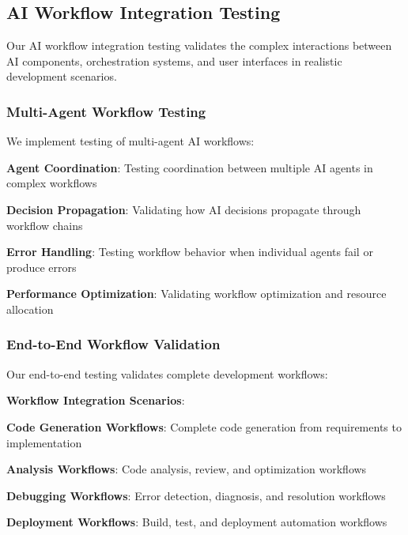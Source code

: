 \subsection*{AI Workflow Integration Testing}

Our AI workflow integration testing validates the complex interactions between AI components, orchestration systems, and user interfaces in realistic development scenarios.

\subsubsection*{Multi-Agent Workflow Testing}

We implement testing of multi-agent AI workflows:

\begin{compactlist}
    \item \textbf{Agent Coordination}: Testing coordination between multiple AI agents in complex workflows
    \item \textbf{Decision Propagation}: Validating how AI decisions propagate through workflow chains
    \item \textbf{Error Handling}: Testing workflow behavior when individual agents fail or produce errors
    \item \textbf{Performance Optimization}: Validating workflow optimization and resource allocation
\end{compactlist}

\subsubsection*{End-to-End Workflow Validation}

Our end-to-end testing validates complete development workflows:

\begin{alertbox}
\textbf{Workflow Integration Scenarios}:
\begin{compactlist}
    \item \textbf{Code Generation Workflows}: Complete code generation from requirements to implementation
    \item \textbf{Analysis Workflows}: Code analysis, review, and optimization workflows
    \item \textbf{Debugging Workflows}: Error detection, diagnosis, and resolution workflows
    \item \textbf{Deployment Workflows}: Build, test, and deployment automation workflows
\end{compactlist}
\end{alertbox}

